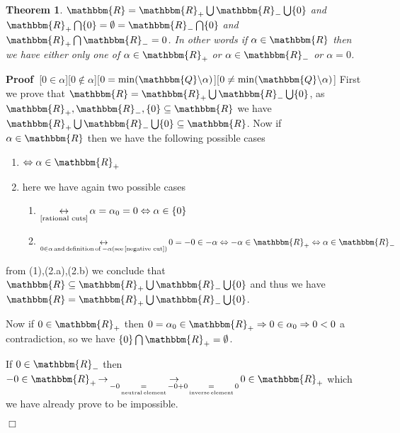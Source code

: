 \documentclass{book}
\newcommand{\Leftrightarrowlim}{\mathop{\leftrightarrow}\limits}
\newcommand{\Rightarrowlim}{\mathop{\rightarrow}\limits}
\newcommand{\equallim}{\mathop{=}\limits}
\newcommand{\nin}{\not\in}
\newcommand{\tmop}[1]{\ensuremath{\operatorname{#1}}}
\newcommand{\um}{-}
\newenvironment{proof}{\noindent\textbf{Proof\ }}{\hspace*{\fill}$\Box$\medskip}
\newtheorem{theorem}{Theorem}
\begin{document}
{{\begin{theorem}
  \label{disjoint union of reals}$\mathbbm{R}=\mathbbm{R}_+ \bigcup
  \mathbbm{R}_- \bigcup \{ 0 \}$ and $\mathbbm{R}_+ \bigcap \{ 0 \} =
  \emptyset =\mathbbm{R}_- \bigcap \{ 0 \}$ and $\mathbbm{R}_+ \bigcap
  \mathbbm{R}_- = 0$. In other words if $\alpha \in \mathbbm{R}$ then we have
  either only one of $\alpha \in \mathbbm{R}_+$ or $\alpha \in \mathbbm{R}_-$
  or $\alpha = 0$.
\end{theorem}

\begin{proof}[$0 \in \alpha$][$0 \nin \alpha$][$0 = \min (\mathbbm{Q}
\backslash \alpha)$][$0 \neq \min (\mathbbm{Q} \backslash \alpha)$]
  First we prove that $\mathbbm{R}=\mathbbm{R}_+ \bigcup \mathbbm{R}_- \bigcup
  \{ 0 \}$, as $\mathbbm{R}_+, \mathbbm{R}_-, \{ 0 \} \subseteq \mathbbm{R}$
  we have $\mathbbm{R}_+ \bigcup \mathbbm{R}_- \bigcup \{ 0 \} \subseteq
  \mathbbm{R}$. Now if $\alpha \in \mathbbm{R}$ then we have the following
  possible cases
  \begin{enumerate}
    \item $\Leftrightarrow \alpha \in \mathbbm{R}_+$
    
    \item here we have again two possible cases
    \begin{enumerate}
      \item $\Leftrightarrowlim_{\text{\ref{rational cuts}}} \alpha = \alpha_0
      = 0 \Leftrightarrow \alpha \in \{ 0 \}$
      
      \item $\Leftrightarrowlim_{0 \in \alpha \tmop{and} \tmop{definition}
      \tmop{of} \um \alpha \left( \tmop{see} \text{\ref{negative cut}}
      \right)} 0 = - 0 \in - \alpha \Leftrightarrow - \alpha \in \mathbbm{R}_+
      \Leftrightarrow \alpha \in \mathbbm{R}_-$
    \end{enumerate}
  \end{enumerate}
  from (1),(2.a),(2.b) we conclude that $\mathbbm{R} \subseteq \mathbbm{R}_+
  \bigcup \mathbbm{R}_- \bigcup \{ 0 \}$ and thus we have
  $\mathbbm{R}=\mathbbm{R}_+ \bigcup \mathbbm{R}_- \bigcup \{ 0 \}$.
  
  Now if $0 \in \mathbbm{R}_+$ then $0 = \alpha_0 \in \mathbbm{R}_+
  \Rightarrow 0 \in \alpha_0 \Rightarrow 0 < 0$ a contradiction, so we have
  $\{ 0 \} \bigcap \mathbbm{R}_+ = \emptyset$.
  
  If $0 \in \mathbbm{R}_-$ then $- 0 \in \mathbbm{R}_+ \Rightarrowlim
  \Rightarrowlim_{- 0 \equallim_{\tmop{neutral} \tmop{element}} - 0 + 0
  \equallim_{\tmop{inverse} \tmop{element}} 0} 0 \in \mathbbm{R}_+$ which we
  have already prove to be impossible.
  

\end{proof}}}
\end{document}
